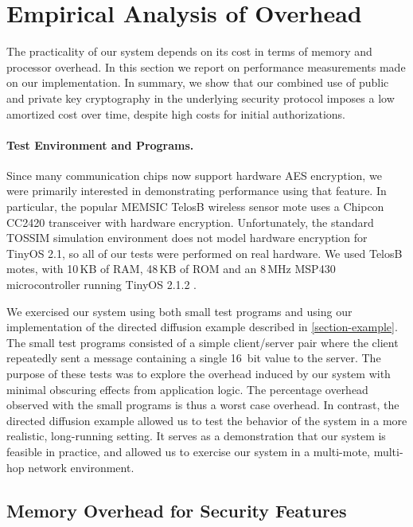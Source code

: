 \section{Empirical Analysis of Overhead}
\label{sec:empirical-results}
\label{section-empirical-results}

The practicality of our system depends on its cost in terms of memory
and processor overhead. In this section we report on performance
measurements made on our implementation. In summary, we show that our
combined use of public and private key cryptography in the underlying
security protocol imposes a low amortized cost over time, despite high
costs for initial authorizations.

\paragraph{Test Environment and Programs.} Since many communication
chips now support hardware AES encryption, we were primarily interested
in demonstrating performance using that feature. In particular, the
popular MEMSIC TelosB wireless sensor mote \cite{telosb-datasheet} uses
a Chipcon CC2420 transceiver with hardware encryption. Unfortunately,
the standard TOSSIM simulation environment does not model hardware
encryption for TinyOS 2.1, so all of our tests were performed on real
hardware. We used TelosB motes, with 10\,KB of RAM, 48\,KB of ROM and an
8\,MHz MSP430 microcontroller running TinyOS 2.1.2 \cite{tinyos}.

We exercised our system using both small test programs and using our
implementation of the directed diffusion example described in
\autoref{section-example}. The small test programs consisted of a simple
client/server pair where the client repeatedly sent a message containing
a single 16~bit value to the server. The purpose of these tests was to
explore the overhead induced by our system with minimal obscuring
effects from application logic. The percentage overhead observed with
the small programs is thus a worst case overhead. In contrast, the
directed diffusion example allowed us to test the behavior of the system
in a more realistic, long-running setting. It serves as a demonstration
that our system is feasible in practice, and allowed us to exercise our
system in a multi-mote, multi-hop network environment.

\subsection{Memory Overhead for Security Features}

